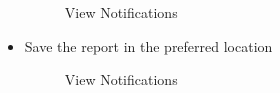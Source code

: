 \documentclass[12pt]{article}
\begin{document}
\begin{itemize}
\begin{figure}[H]
\centering	
{}
\caption{View Notifications}
\end{figure}

\item Save the report in the preferred location


\begin{figure}[H]
\centering	
{}
\caption{View Notifications}
\end{figure}

\end{itemize}
\end{document}
